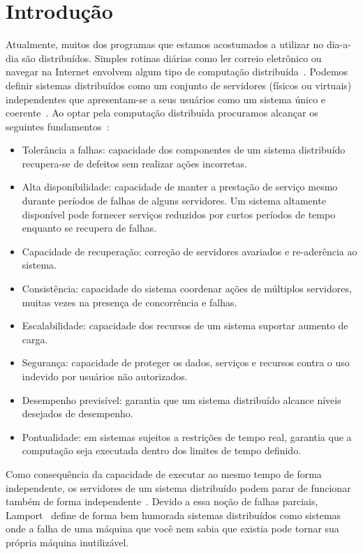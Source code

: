 \chapter*[Introdução]{Introdução}

Atualmente, muitos dos programas que estamos acostumados a utilizar no dia-a-dia são
distribuídos. Simples rotinas diárias como ler correio eletrônico ou navegar na Internet
envolvem algum tipo de computação distribuída~\cite{cachin11}. Podemos definir sistemas
distribuídos como um conjunto de servidores (físicos ou virtuais) independentes que
apresentam-se a seus usuários como um sistema único e coerente~\cite{tanenbaum07}. Ao
optar pela computação distribuída procuramos alcançar os seguintes
fundamentos~\cite{birman05}:

\begin{itemize}
  \item Tolerância a falhas: capacidade dos componentes de um sistema distribuído
    recupera-se de defeitos sem realizar ações incorretas.
  \item Alta disponibilidade: capacidade de manter a prestação de serviço mesmo durante
    períodos de falhas de alguns servidores. Um sistema altamente disponível pode fornecer
    serviços reduzidos por curtos períodos de tempo enquanto se recupera de falhas.
  \item Capacidade de recuperação: correção de servidores avariados e re-aderência ao
    sistema.
  \item Consistência: capacidade do sistema coordenar ações de múltiplos servidores,
    muitas vezes na presença de concorrência e falhas.
  \item Escalabilidade: capacidade dos recursos de um sistema suportar aumento de carga.
  \item Segurança: capacidade de proteger os dados, serviços e recursos contra o uso
    indevido por usuários não autorizados.
  \item Desempenho previsível: garantia que um sistema distribuído alcance níveis
    desejados de desempenho.
  \item Pontualidade: em sistemas sujeitos a restrições de tempo real, garantia que
    a computação seja executada dentro dos limites de tempo definido.
\end{itemize}

Como consequência da capacidade de executar ao mesmo tempo de forma independente, os
servidores de um sistema distribuído podem parar de funcionar também de forma
independente~\cite{cachin11}. Devido a essa noção de falhas parciais,
Lamport~\cite{cachin11} define de forma bem humorada sistemas distribuídos como sistemas
onde a falha de uma máquina que você nem sabia que existia pode tornar sua própria
máquina inutilizável.

